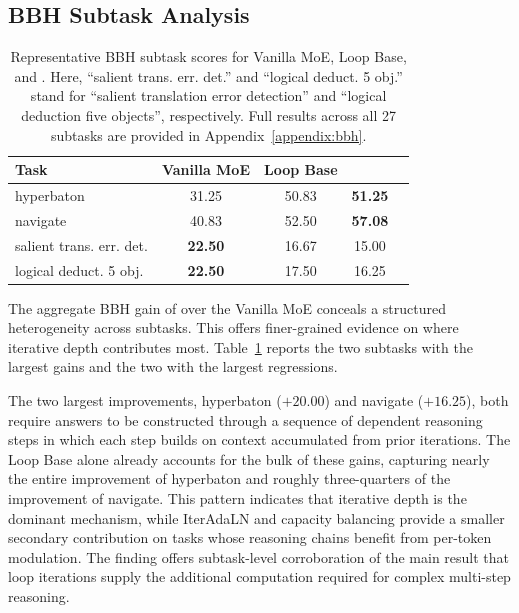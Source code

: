 \subsection{BBH Subtask Analysis}

\begin{table}[t]
\centering
\small
\setlength{\tabcolsep}{2.5pt}
\begin{tabular}{lcccc}
\toprule
\textbf{Task} & \textbf{Vanilla MoE} & \textbf{Loop Base} & \textbf{\ourmodelnospace}\\
\midrule
hyperbaton            & 31.25 & 50.83 & \textbf{51.25}\\
navigate              & 40.83 & 52.50 & \textbf{57.08}\\
salient trans. err. det. & \textbf{22.50} & 16.67 & 15.00\\
logical deduct. 5 obj. & \textbf{22.50} & 17.50 & 16.25 \\
\bottomrule
\end{tabular}
\caption{Representative BBH subtask scores for Vanilla MoE, Loop Base, and \ourmodelnospace. Here, ``salient trans. err. det.'' and ``logical deduct. 5 obj.'' stand for ``salient translation error detection'' and ``logical deduction five objects'', respectively. Full results across all 27 subtasks are provided in Appendix~\ref{appendix:bbh}.}
\label{tab:bbh_highlight}
\end{table}

The aggregate BBH gain of \ourmodel over the Vanilla MoE conceals a structured heterogeneity across subtasks. This offers finer-grained evidence on where iterative depth contributes most. Table~\ref{tab:bbh_highlight} reports the two subtasks with the largest gains and the two with the largest regressions.

The two largest improvements, hyperbaton ($+20.00$) and navigate ($+16.25$), both require answers to be constructed through a sequence of dependent reasoning steps in which each step builds on context accumulated from prior iterations. The Loop Base alone already accounts for the bulk of these gains, capturing nearly the entire improvement of hyperbaton and roughly three-quarters of the improvement of navigate. This pattern indicates that iterative depth is the dominant mechanism, while IterAdaLN and capacity balancing provide a smaller secondary contribution on tasks whose reasoning chains benefit from per-token modulation. The finding offers subtask-level corroboration of the main result that loop iterations supply the additional computation required for complex multi-step reasoning. 

